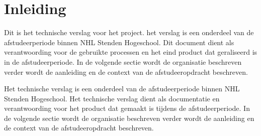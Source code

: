 \chapter{Inleiding}
Dit is het technische verslag voor het  project.
het verslag is een onderdeel van de afstudeerperiode binnen NHL Stenden Hogeschool.
Dit document dient als verantwoording voor de gebruikte processen en het eind product dat geraliseerd is in de afstudeerperiode.
In de volgende sectie wordt de organisatie beschreven verder wordt de aanleiding en de context van de afstudeeropdracht beschreven.


Het technische verslag is een onderdeel van de afstudeerperiode binnen NHL Stenden Hogeschool.
Het technische verslag dient als documentatie en verantwoording voor het product dat gemaakt is tijdens de afstudeerperiode.
In de volgende sectie wordt de organisatie beschreven verder wordt de aanleiding en de context van de afstudeeropdracht beschreven.


 

\newpage


